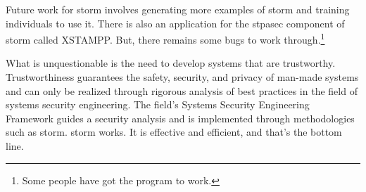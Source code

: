 \documentclass[../../main/main.tex]{subfiles}
\begin{document}
Future work for \gls{storm} involves generating more examples of \gls{storm} and training individuals to use it.  There is also an application for the \gls{stpasec} component of \gls{storm} called XSTAMPP.  But, there remains some bugs to work through.\footnote{Some people have got the program to work.}




What is unquestionable is the need to develop systems that are trustworthy.   Trustworthiness guarantees the safety, security, and privacy of man-made systems and can only be realized through rigorous analysis of best practices in the field of systems security engineering.  The  field's Systems Security Engineering Framework guides a security analysis and is implemented through methodologies such as  \gls{storm}.  \gls{storm} works.  It is effective and efficient, and that's the bottom line.



%
\end{document}
